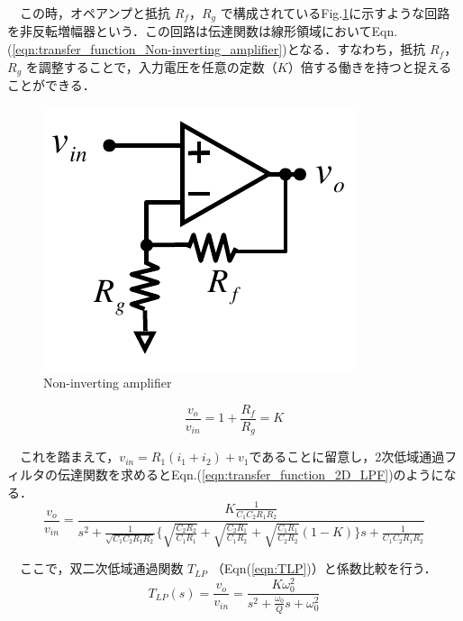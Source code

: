 　この時，オペアンプと抵抗 $R_f$，$R_g$ で構成されているFig.\ref{fig:Non-inverting_amplifier}に示すような回路を非反転増幅器という．この回路は伝達関数は線形領域においてEqn.(\ref{eqn:transfer_function_Non-inverting_amplifier})となる．すなわち，抵抗 $R_f$，$R_g$ を調整することで，入力電圧を任意の定数（$K$）倍する働きを持つと捉えることができる．
\begin{figure}[H]
    \centering
    \includegraphics[scale=0.5]{./fig/Non-inverting_amplifier.pdf}
    \caption{Non-inverting amplifier}
    \label{fig:Non-inverting_amplifier}
\end{figure}

\begin{equation}
    \frac{v_{o}}{v_{i n}}=1+\frac{R_{f}}{R_{g}}=K
    \label{eqn:transfer_function_Non-inverting_amplifier}
\end{equation}

　これを踏まえて，$v_{i n}=R_{1}\left(i_{1}+i_{2}\right)+v_{1}$であることに留意し，2次低域通過フィルタの伝達関数を求めるとEqn.(\ref{eqn:transfer_function_2D_LPF})のようになる．
\begin{equation}
    \frac{v_{o}}{v_{i n}} = \frac{K \frac{1}{C_{1} C_{2} R_{1} R_{2}}}{s^{2}+\frac{1}{\sqrt{C_{1} C_{2} R_{1} R_{2}}}\{\sqrt{\frac{C_{2} R_{2}}{C_{1} R_{1}}}+\sqrt{\frac{C_{2} R_{1}}{C_{1} R_{2}}}+\sqrt{\frac{C_{1} R_{1}}{C_{2} R_{2}}}(1-K)\} s+\frac{1}{C_{1} C_{2} R_{1} R_{2}}}
    \label{eqn:transfer_function_2D_LPF}
\end{equation}

　ここで，双二次低域通過関数 $T_{LP}$ （Eqn(\ref{eqn:TLP})）と係数比較を行う．
\begin{equation}
    T_{L P}(s)=\frac{v_{o}}{v_{in}}=\frac{K \omega_{0}^{2}}{s^{2}+\frac{\omega_{0}}{Q} s+\omega_{0}^{2}}
    \label{eqn:TLP}
\end{equation}

